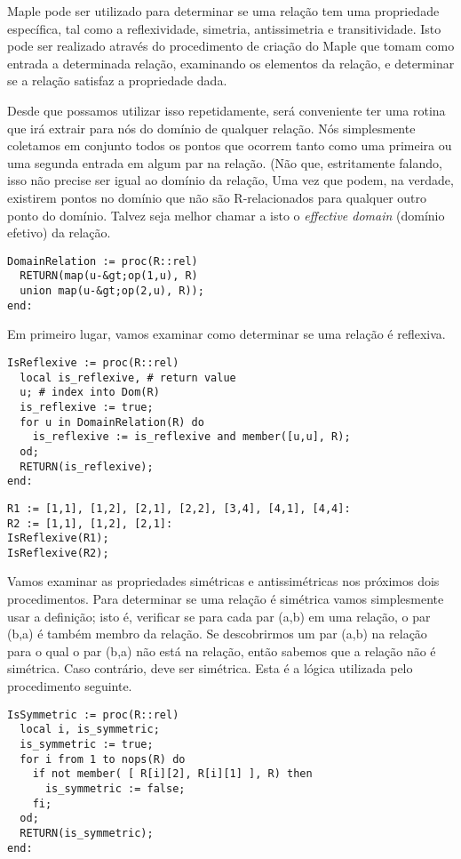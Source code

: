 \documentclass[a4paper]{article}
\begin{document}
Maple pode ser utilizado para determinar se uma relação tem uma propriedade específica, tal como a reflexividade, simetria, antissimetria e transitividade. Isto pode ser realizado através do procedimento de criação do Maple que tomam como entrada a determinada relação, examinando os elementos da relação, e determinar se a relação satisfaz a propriedade dada.

Desde que possamos utilizar isso repetidamente, será conveniente ter uma rotina que irá extrair para nós do domínio de qualquer relação. Nós simplesmente coletamos em conjunto todos os pontos que ocorrem tanto como uma primeira ou uma segunda entrada em algum par na relação. (Não que, estritamente falando, isso não precise ser igual ao domínio da relação, Uma vez que podem, na verdade, existirem pontos no domínio que não são R-relacionados para qualquer outro ponto do domínio. Talvez seja melhor chamar a isto o \textit{effective domain} (domínio efetivo) da relação.

\begin{lstlisting}
DomainRelation := proc(R::rel)
  RETURN(map(u-&gt;op(1,u), R)
  union map(u-&gt;op(2,u), R));
end:
\end{lstlisting}

Em primeiro lugar, vamos examinar como determinar se uma relação é reflexiva.

\begin{lstlisting}
IsReflexive := proc(R::rel)
  local is_reflexive, # return value
  u; # index into Dom(R)
  is_reflexive := true;
  for u in DomainRelation(R) do
    is_reflexive := is_reflexive and member([u,u], R);
  od;
  RETURN(is_reflexive);
end:
\end{lstlisting}

\begin{lstlisting}
R1 := [1,1], [1,2], [2,1], [2,2], [3,4], [4,1], [4,4]:
R2 := [1,1], [1,2], [2,1]:
IsReflexive(R1);
IsReflexive(R2);
\end{lstlisting}

Vamos examinar as propriedades simétricas e antissimétricas nos próximos dois procedimentos. Para determinar se uma relação é simétrica vamos simplesmente usar a definição; isto é, verificar se para cada par (a,b) em uma relação, o par (b,a) é também membro da relação. Se descobrirmos um par (a,b) na relação para o qual o par (b,a) não está na relação, então sabemos que a relação não é simétrica. Caso contrário, deve ser simétrica. Esta é a lógica utilizada pelo procedimento seguinte.

\begin{lstlisting}
IsSymmetric := proc(R::rel)
  local i, is_symmetric;
  is_symmetric := true;
  for i from 1 to nops(R) do
    if not member( [ R[i][2], R[i][1] ], R) then
      is_symmetric := false;
    fi;
  od;
  RETURN(is_symmetric);
end:
\end{lstlisting}
\end{document}
